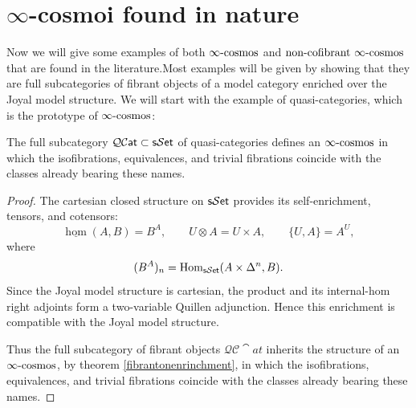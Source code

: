 

\section{$\infty$-cosmoi found in nature}\label{nature}

Now we will give some examples of both $\infty\text{-cosmos}$ and $\text{non-cofibrant }\infty\text{-cosmos}$ that are found in the literature.Most examples will be given by showing that they are full subcategories of fibrant objects of a model category enriched over the Joyal model structure. We will start with the example of quasi-categories, which is the prototype of $\infty\text{-cosmos}$:

\begin{ex}
The full subcategory $\mathcal{QC}\textup{\textsf{at}}\subset \textup{\textsf{s}}\mathcal{S}\textup{\textsf{et}}$ of quasi-categories defines an $\infty\text{-cosmos}$ in which the isofibrations, equivalences, and trivial fibrations coincide with the classes already bearing these names.
\end{ex}
\begin{proof}
The cartesian closed structure on $\textup{\textsf{s}}\mathcal{S}\textup{\textsf{et}}$ provides its self-enrichment, tensors, and cotensors:
\[
    \underline{\operatorname{hom}}(A,B)=B^A,
    \qquad U\otimes A=U\times A,
    \qquad \{U,A\}=A^U,
\]
where
\[
    (B^A)_n=\operatorname{Hom}_{\textup{\textsf{s}}\mathcal{S}\textup{\textsf{et}}}(A\times\Delta^n,B).
\]
Since the Joyal model structure is cartesian, the product and its internal-hom right adjoints form a two-variable Quillen adjunction. Hence this enrichment is compatible
with the Joyal model structure.

Thus the full subcategory of fibrant objects $\mathcal{QC}\cat{at}$ inherits the structure of an $\infty\text{-cosmos}$, by theorem \ref{fibrantonenrinchment}, in which the isofibrations, equivalences, and trivial fibrations coincide with the classes already bearing these names.
    
\end{proof}

